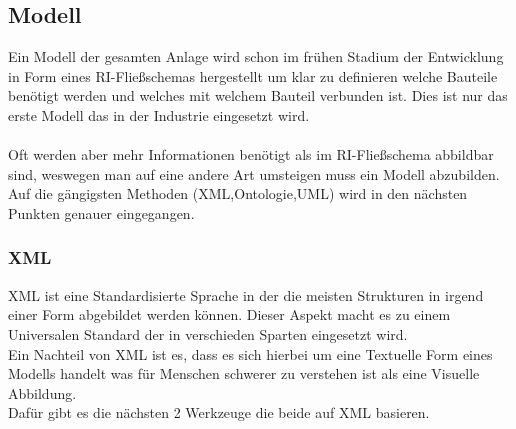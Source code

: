 \subsection{Modell}
Ein Modell der gesamten Anlage wird schon im frühen Stadium der Entwicklung in Form eines RI-Fließschemas hergestellt um klar zu definieren welche Bauteile benötigt werden und welches mit welchem Bauteil verbunden ist. Dies ist nur das erste Modell das in der Industrie eingesetzt wird.\\
\\
Oft werden aber mehr Informationen benötigt als im RI-Fließschema abbildbar sind, weswegen man auf eine andere Art umsteigen muss ein Modell abzubilden.\\
Auf die gängigsten Methoden (XML,Ontologie,UML) wird in den nächsten Punkten genauer eingegangen.
\subsubsection{XML}
XML ist eine Standardisierte Sprache in der die meisten Strukturen in irgend einer Form abgebildet werden können. Dieser Aspekt macht es zu einem Universalen Standard der in verschieden Sparten eingesetzt wird.\\
Ein Nachteil von XML ist es, dass es sich hierbei um eine Textuelle Form eines Modells handelt was für Menschen schwerer zu verstehen ist als eine Visuelle Abbildung.\\
Dafür gibt es die nächsten 2 Werkzeuge die beide auf XML basieren.
